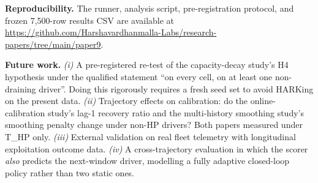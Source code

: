 \textbf{Reproducibility.} The runner, analysis script, pre-registration
protocol, and frozen 7{,}500-row results CSV are available at
\url{https://github.com/Harshavardhanmalla-Labs/research-papers/tree/main/paper9}.

\textbf{Future work.}
\textit{(i)} A pre-registered re-test of the capacity-decay study's H4 hypothesis under
the qualified statement ``on every cell, on at least one non-draining
driver''. Doing this rigorously requires a fresh seed set to avoid
HARKing on the present data.
\textit{(ii)} Trajectory effects on calibration: do the online-calibration study's lag-1
recovery ratio and the multi-history smoothing study's smoothing penalty change under non-HP
drivers? Both papers measured under T\_HP only.
\textit{(iii)} External validation on real fleet telemetry with
longitudinal exploitation outcome data.
\textit{(iv)} A cross-trajectory evaluation in which the scorer
\textit{also} predicts the next-window driver, modelling a fully
adaptive closed-loop policy rather than two static ones.
